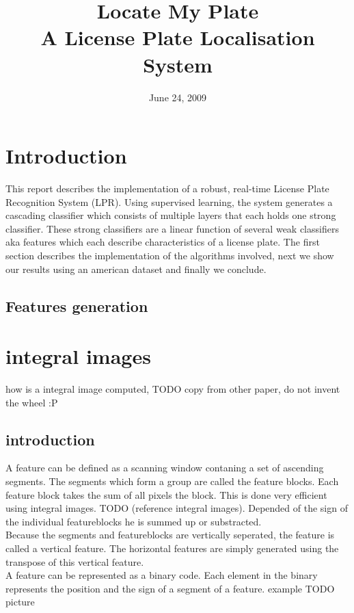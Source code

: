 \documentclass[a4paper,11pt]{article}
\title{Locate My Plate \\ A License Plate Localisation System}
\date{June 24, 2009}
\begin{document}
\maketitle
\section*{Introduction}
This report describes the implementation of a robust, real-time License Plate
Recognition System (LPR). Using supervised learning, the system generates a
cascading classifier which consists of multiple layers that each holds one
strong classifier. These strong classifiers are a linear function of several
weak classifiers aka features which each describe characteristics of a license
plate. The first section describes the implementation of the algorithms
involved, next we show our results using an american dataset and finally we
conclude.


\subsection{Features generation}
\section*{integral images}
how is a integral image computed, TODO copy from other paper, do not invent the
wheel :P

	\subsection{introduction}
	A feature can be defined as a scanning window contaning a set of ascending
	segments. The segments which form a group are called the feature blocks. Each
	feature block takes the sum of all pixels the block. This is done very
	efficient using integral images.  TODO (reference integral images). Depended
	of the sign of the individual featureblocks he is summed up or substracted.\\ 

	Because the segments and featureblocks are vertically seperated, the
	feature is called a vertical feature.  The horizontal features are simply
	generated using the transpose of this vertical feature.\\

	A feature can be represented as a binary code. Each element in the binary
	represents the position and the sign of a segment of a feature.
	example TODO picture\\
\end{document}
